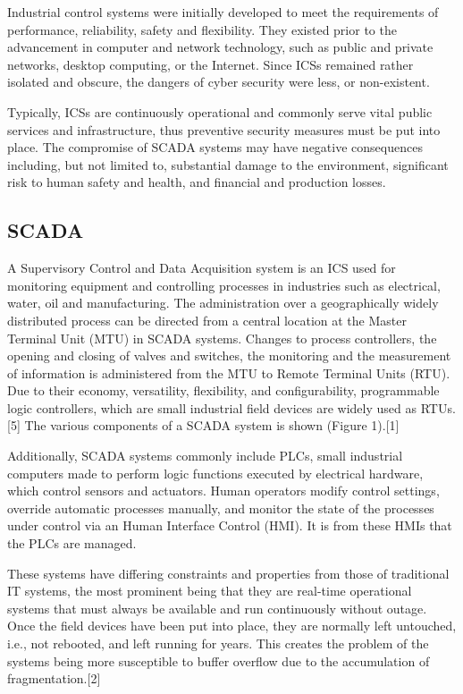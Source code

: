 \documentclass[11pt,a4paper]{article}
\begin{document}
Industrial control systems were initially developed to meet the
requirements of performance, reliability, safety and flexibility. They
existed prior to the advancement in computer and network technology,
such as public and private networks, desktop computing, or the Internet.
Since ICSs remained rather isolated and obscure, the dangers of cyber
security were less, or non-existent.

Typically, ICSs are continuously operational and commonly serve vital
public services and infrastructure, thus preventive security measures
must be put into place. The compromise of SCADA systems may have
negative consequences including, but not limited to, substantial damage
to the environment, significant risk to human safety and health, and
financial and production losses.

\subsection{SCADA}\label{scada}

A Supervisory Control and Data Acquisition system is an ICS used for
monitoring equipment and controlling processes in industries such as
electrical, water, oil and manufacturing. The administration over a
geographically widely distributed process can be directed from a central
location at the Master Terminal Unit (MTU) in SCADA systems. Changes to
process controllers, the opening and closing of valves and switches, the
monitoring and the measurement of information is administered from the
MTU to Remote Terminal Units (RTU). Due to their economy, versatility,
flexibility, and configurability, programmable logic controllers, which
are small industrial field devices are widely used as RTUs.{[}5{]} The
various components of a SCADA system is shown (Figure 1).{[}1{]}

Additionally, SCADA systems commonly include PLCs, small industrial
computers made to perform logic functions executed by electrical
hardware, which control sensors and actuators. Human operators modify
control settings, override automatic processes manually, and monitor the
state of the processes under control via an Human Interface Control
(HMI). It is from these HMIs that the PLCs are managed.

These systems have differing constraints and properties from those of
traditional IT systems, the most prominent being that they are real-time
operational systems that must always be available and run continuously
without outage. Once the field devices have been put into place, they
are normally left untouched, i.e., not rebooted, and left running for
years. This creates the problem of the systems being more susceptible to
buffer overflow due to the accumulation of fragmentation.{[}2{]}
\end{document}
